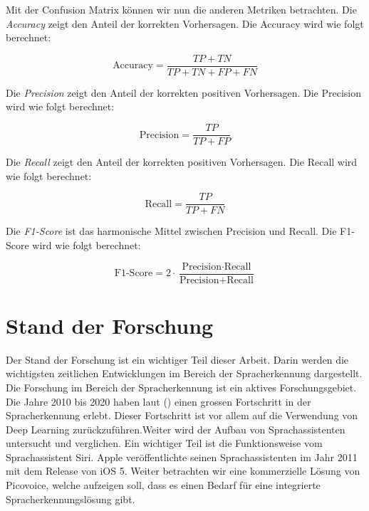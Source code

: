 \documentclass[11pt,a4paper]{article}
\begin{document}
\noindent \newline
Mit der Confusion Matrix können wir nun die anderen Metriken betrachten. Die \textit{Accuracy} 
zeigt den Anteil der korrekten Vorhersagen. Die Accuracy wird wie folgt berechnet:

\begin{equation*}
	\text{Accuracy} = \frac{TP + TN}{TP + TN + FP + FN}
\end{equation*}

\noindent \newline
Die \textit{Precision} zeigt den Anteil der korrekten positiven Vorhersagen. Die Precision wird wie 
folgt berechnet:

\begin{equation*}
	\text{Precision} = \frac{TP}{TP + FP}
\end{equation*}

\noindent \newline
Die \textit{Recall} zeigt den Anteil der korrekten positiven Vorhersagen. Die Recall wird wie 
folgt berechnet:

\begin{equation*}
	\text{Recall} = \frac{TP}{TP + FN}
\end{equation*}

\noindent  \newline
Die \textit{F1-Score} ist das harmonische Mittel zwischen Precision und Recall. Die F1-Score wird 
wie folgt berechnet:

\begin{equation*}
	\text{F1-Score} = 2 \cdot \frac{\text{Precision} \cdot \text{Recall}}{\text{Precision} + 
	\text{Recall}}
\end{equation*}

\newpage \section{Stand der Forschung}
Der Stand der Forschung ist ein wichtiger Teil dieser Arbeit. Darin werden die wichtigsten
zeitlichen Entwicklungen im Bereich der Spracherkennung dargestellt. Die Forschung im Bereich 
der Spracherkennung ist ein aktives Forschungsgebiet. Die Jahre 2010 bis 2020 haben laut 
(\cite{hannun2021history}) einen grossen Fortschritt in der Spracherkennung erlebt. Dieser 
Fortschritt ist vor allem auf die Verwendung von Deep Learning zurückzuführen.Weiter wird der 
Aufbau von Sprachassistenten untersucht und verglichen. Ein wichtiger Teil ist die Funktionsweise 
vom Sprachassistent Siri. Apple veröffentlichte seinen Sprachassistenten im Jahr 2011 mit dem 
Release von iOS 5. Weiter betrachten wir eine kommerzielle Lösung von Picovoice, welche aufzeigen 
soll, dass es einen Bedarf für eine integrierte Spracherkennungslösung gibt.
\end{document}
